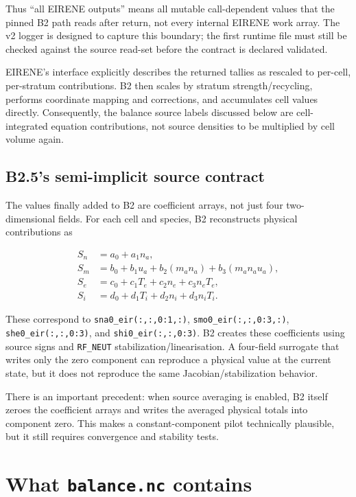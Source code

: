 \documentclass[11pt]{article}
\begin{document}
Thus ``all EIRENE outputs'' means all mutable call-dependent values that the
pinned B2 path reads after return, not every internal EIRENE work array. The
v2 logger is designed to capture this boundary; the first runtime file must
still be checked against the source read-set before the contract is declared
validated.

EIRENE's interface explicitly describes the returned tallies as rescaled to per-cell, per-stratum contributions. B2 then scales by stratum strength/recycling, performs coordinate mapping and corrections, and accumulates cell values directly. Consequently, the balance source labels discussed below are cell-integrated equation contributions, not source densities to be multiplied by cell volume again.

\subsection{B2.5's semi-implicit source contract}

The values finally added to B2 are coefficient arrays, not just four two-dimensional fields. For each cell and species, B2 reconstructs physical contributions as

\begin{align}
S_n &= a_0 + a_1 n_a,\\
S_m &= b_0 + b_1 u_a + b_2(m_a n_a) + b_3(m_a n_a u_a),\\
S_e &= c_0 + c_1 T_e + c_2 n_e + c_3 n_eT_e,\\
S_i &= d_0 + d_1 T_i + d_2 n_i + d_3 n_iT_i.
\end{align}

These correspond to \texttt{sna0\_eir(:,:,0:1,:)}, \texttt{smo0\_eir(:,:,0:3,:)}, \texttt{she0\_eir(:,:,0:3)}, and \texttt{shi0\_eir(:,:,0:3)}. B2 creates these coefficients using source signs and \texttt{RF\_NEUT} stabilization/linearisation. A four-field surrogate that writes only the zero component can reproduce a physical value at the current state, but it does not reproduce the same Jacobian/stabilization behavior.

There is an important precedent: when source averaging is enabled, B2 itself zeroes the coefficient arrays and writes the averaged physical totals into component zero. This makes a constant-component pilot technically plausible, but it still requires convergence and stability tests.

\section{What \texttt{balance.nc} contains}
\end{document}
